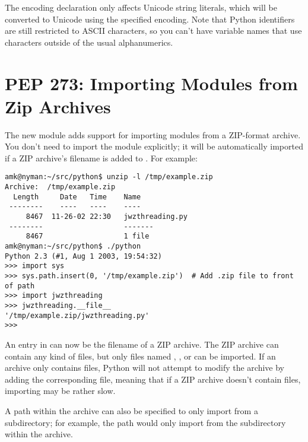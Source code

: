 \documentclass{howto}
\begin{document}
The encoding declaration only affects Unicode string literals, which
will be converted to Unicode using the specified encoding.  Note that
Python identifiers are still restricted to ASCII characters, so you
can't have variable names that use characters outside of the usual
alphanumerics.

\begin{seealso}


\end{seealso}


\section{PEP 273: Importing Modules from Zip Archives}

The new  module adds support for importing
modules from a ZIP-format archive.  You don't need to import the
module explicitly; it will be automatically imported if a ZIP
archive's filename is added to .  For example:

\begin{verbatim}
amk@nyman:~/src/python$ unzip -l /tmp/example.zip
Archive:  /tmp/example.zip
  Length     Date   Time    Name
 --------    ----   ----    ----
     8467  11-26-02 22:30   jwzthreading.py
 --------                   -------
     8467                   1 file
amk@nyman:~/src/python$ ./python
Python 2.3 (#1, Aug 1 2003, 19:54:32) 
>>> import sys
>>> sys.path.insert(0, '/tmp/example.zip')  # Add .zip file to front of path
>>> import jwzthreading
>>> jwzthreading.__file__
'/tmp/example.zip/jwzthreading.py'
>>>
\end{verbatim}

An entry in  can now be the filename of a ZIP archive.
The ZIP archive can contain any kind of files, but only files named
, , or  can be imported.  If an
archive only contains  files, Python will not attempt to
modify the archive by adding the corresponding  file, meaning
that if a ZIP archive doesn't contain  files, importing may be
rather slow.

A path within the archive can also be specified to only import from a
subdirectory; for example, the path 
would only import from the  subdirectory within the
archive.
\end{document}

